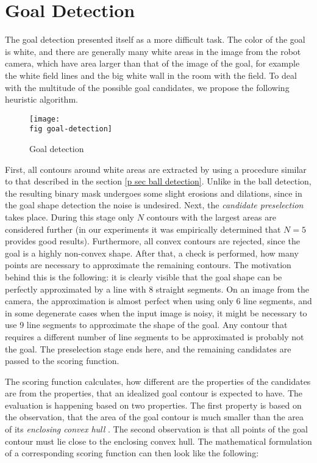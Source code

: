 \section{Goal Detection}
\label{p sec goal detect}

The goal detection presented itself as a more difficult task. The color of the
goal is white, and there are generally many white areas in the image from the
robot camera, which have area larger than that of the image of the goal, for
example the white field lines and the big white wall in the room with the
field. To deal with the multitude of the possible goal candidates, we
propose the following heuristic algorithm.

\begin{figure}[ht]
  \texttt{[image: \\fig goal-detection]}
  \caption{Goal detection}
  \label{p figure goal-detection}
\end{figure}

First, all contours around white areas are extracted by using a procedure
similar to that described in the section \ref{p sec ball detection}. Unlike in
the ball detection, the resulting binary mask undergoes some slight erosions
and dilations, since in the goal shape detection the noise is undesired. Next,
the \textit{candidate preselection} takes place. During this stage only $N$
contours with the largest areas are considered further (in our experiments it
was empirically determined that $N=5$ provides good results). Furthermore, all
convex contours are rejected, since the goal is a highly non-convex shape.
After that, a check is performed, how many points are necessary to approximate
the remaining contours. The motivation behind this is the following: it is
clearly visible that the goal shape can be perfectly approximated by a line
with 8 straight segments. On an image from the camera, the approximation is
almost perfect when using only 6 line segments, and in some degenerate cases
when the input image is noisy, it might be necessary to use 9 line segments to
approximate the shape of the goal. Any contour that requires a different number
of line segments to be approximated is probably not the goal. The preselection
stage ends here, and the remaining candidates are passed to the scoring
function.

The scoring function calculates, how different are the properties of the
candidates are from the properties, that an idealized goal contour is expected
to have. The evaluation is happening based on two properties. The first
property is based on the observation, that the area of the goal contour is much
smaller than the area of its \textit{enclosing convex hull} \cite{convex-hull}.
The second observation is that all points of the goal contour must lie close to
the enclosing convex hull. The mathematical formulation of a corresponding
scoring function can then look like the following:

